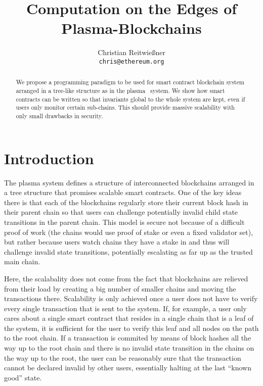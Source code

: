 \documentclass[11pt,letterpaper]{article}
\date{}
\begin{document}

\title{Computation on the Edges of Plasma-Blockchains}

\author{Christian Reitwießner\\
{\tt chris@ethereum.org}}


\maketitle

\begin{abstract}
We propose a programming paradigm to be used for smart contract blockchain
system arranged in a tree-like structure as in the plasma~\cite{plasma} system.
We show how smart contracts can be written so that invariants global to the
whole system are kept, even if users only monitor certain sub-chains.
This should provide massive scalability with only small drawbacks in security.
\end{abstract}
  

\section{Introduction}

The plasma system \cite{plasma} defines a structure of interconnected blockchains
arranged in a tree structure that promises scalable smart contracts. One of the key
ideas there is that each of the blockchains regularly store their current block hash
in their parent chain so that users can challenge
potentially invalid child state transitions in the parent chain.
This model is secure not because of a difficult proof of work (the chains would
use proof of stake or even a fixed validator set), but rather because
users watch chains they have a stake in and thus will challenge invalid
state transitions, potentially escalating as far up as the trusted main chain.

Here, the scalabality does not come from the fact that blockchains are relieved
from their load by creating a big number of smaller chains and moving the transactions there.
Scalability is only
achieved once a user does not have to verify every single transaction that is
sent to the system. If, for example, a user only cares about a single smart
contract that resides in a single chain that is a leaf of the system,
it is sufficient for the user to verify this leaf and all nodes on the 
path to the root chain. If a transaction is commited by means of block hashes
all the way up to the root chain and there is no invalid state transition in
the chains on the way up to the root, the user can be reasonably sure that
the transaction cannot be declared invalid by other users, essentially
halting at the last ``known good'' state.
\end{document}
